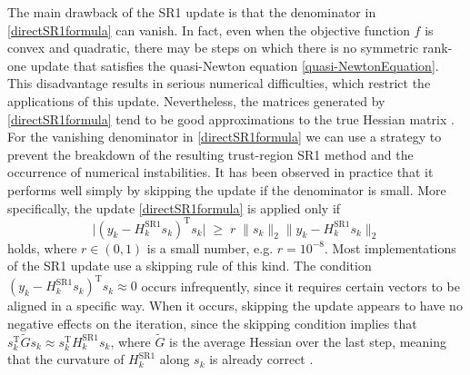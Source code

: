 The main drawback of the SR1 update is that the denominator in \cref{directSR1formula} can vanish. In fact, even when the objective function $f$ is convex and quadratic, there may be steps on which there is no symmetric rank-one update that satisfies the quasi-Newton equation \cref{quasi-NewtonEquation}. This disadvantage results in serious numerical difficulties, which restrict the applications of this update. Nevertheless, the matrices generated by \cref{directSR1formula} tend to be good approximations to the true Hessian matrix \cite[p.~145]{NocedalWright:2006}. \\
For the vanishing denominator in \cref{directSR1formula} we can use a strategy to prevent the breakdown of the resulting trust-region SR1 method and the occurrence of numerical instabilities. It has been observed in practice that it performs well simply by skipping the update if the denominator is small. More specifically, the update \cref{directSR1formula} is applied only if 
\begin{equation}\label{safeguard}
    \lvert (y_k - H^\mathrm{SR1}_k s_k)^{\mathrm{T}} s_k \lvert \; \geq \; r \; \lVert s_k \rVert_2 \lVert y_k - H^\mathrm{SR1}_k s_k \rVert_2 
\end{equation}
holds, where $r \in (0, 1)$ is a small number, e.g. $r = 10^{−8}$. Most implementations of the SR1 update use a skipping rule of this kind. The condition $(y_k - H^\mathrm{SR1}_k s_k)^{\mathrm{T}} s_k \approx 0$ occurs infrequently, since it requires certain vectors to be aligned in a specific way. When it occurs, skipping the update appears to have no negative effects on the iteration, since the skipping condition implies that $s^{\mathrm{T}}_k \tilde{G} s_k \approx s^{\mathrm{T}}_k H^\mathrm{SR1}_k s_k$, where $\tilde{G}$ is the average Hessian over the last step, meaning that the curvature of $H^\mathrm{SR1}_k$ along $s_k$ is already correct \cite[p.~145-146]{NocedalWright:2006}. \\

